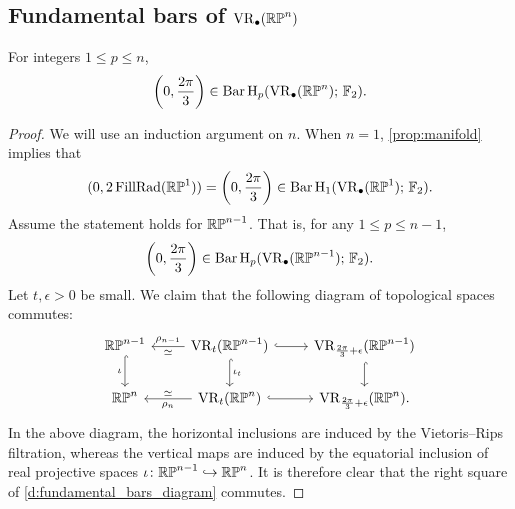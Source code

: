 \subsection{Fundamental bars of $\operatorname{VR}_\bullet(\mathbb{RP}^n)$}

\begin{lemma} \label{prop:RPn bar}
	For integers $1 \leq p \leq n$,
	\[
	\left(0, \frac{2\pi}{3}\right) \in \operatorname{Bar} \operatorname{H}_{p}(\operatorname{VR}_\bullet(\mathbb{RP}^n);\,{\mathbb{F}_2}).
	\]
\end{lemma}

\begin{proof}
	We will use an induction argument on $n$.
	When $n = 1$, \cref{prop:manifold} implies that
	\[
	(0, 2\operatorname{FillRad}(\mathbb{RP}^1)) = \left(0, \frac{2\pi}{3}\right) \in \operatorname{Bar} \operatorname{H}_{1}(\operatorname{VR}_\bullet(\mathbb{RP}^1);\,{\mathbb{F}_2}).
	\]
	Assume the statement holds for $\mathbb{RP}^{n-1}$.
	That is, for any $1 \leq p \leq n-1$,
	\[
	\left(0, \frac{2\pi}{3}\right) \in \operatorname{Bar} \operatorname{H}_{p}(\operatorname{VR}_\bullet(\mathbb{RP}^{n-1});\,{\mathbb{F}_2}).
	\]
	Let $t, \epsilon > 0$ be small.
	We claim that the following diagram of topological spaces commutes:
	\begin{equation}\label{d:fundamental_bars_diagram}
		\begin{tikzcd}
			\rp^{n-1}
			\ar[d, hook,"{\iota}" left]
			&
			\VR_t(\rp^{n-1})
			\ar[d, hook,"\iota_t"]
			\ar[l, "\rho_{n-1}" above, "\simeq" below]
			\ar[r, hook]
			&
			\VR_{\frac{2\pi}{3}+\epsilon}(\rp^{n-1})
			\ar[d, hook]
			\\
			\rp^{n}
			&
			\VR_t(\rp^{n})
			\ar[l, "\rho_n" below, "\simeq" above]
			\ar[r, hook]
			&
			\VR_{\frac{2\pi}{3}+\epsilon}(\rp^{n}).
		\end{tikzcd}
	\end{equation}
	In the above diagram, the horizontal inclusions are induced by the Vietoris--Rips filtration, whereas the vertical maps are induced by the equatorial inclusion of real projective spaces $\iota \colon \mathbb{RP}^{n-1} \hookrightarrow \mathbb{RP}^{n}$.
	It is therefore clear that the right square of \eqref{d:fundamental_bars_diagram} commutes.


\end{proof}

